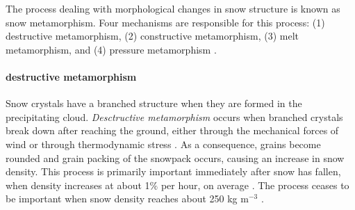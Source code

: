 The process dealing with morphological changes in snow structure is known as snow metamorphism. Four mechanisms are responsible for this process: (1) destructive metamorphism, (2) constructive metamorphism, (3) melt metamorphism, and (4) pressure metamorphism \citep{Alford74}.

\paragraph{destructive metamorphism}
Snow crystals have a branched structure when they are formed in the precipitating cloud. \emph{Desctructive metamorphism} occurs when branched crystals break down after reaching the ground, either through the mechanical forces of wind or through thermodynamic stress \citep{Colbeck83}. As a consequence, grains become rounded and grain packing of the snowpack occurs, causing an increase in snow density. This process is primarily important immediately after snow has fallen, when density increases  at about 1$\%$ per hour, on average \citep{Gunn65}. The process ceases to be important when snow density reaches about 250 kg m$^{-3}$ \citep{Anderson76}.

